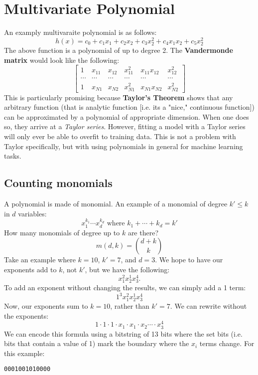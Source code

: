 \documentclass[titlepage, 12pt, leqno]{article}
\begin{document}
\section{Multivariate Polynomial}
An examply multivaraite polynomial is as follows:
\[
    h(x) = c_0 + c_1x_1 + c_2x_2 + c_3x_2^{2} + c_4x_1x_2 + c_5x_2^{2}
\]
The above function is a polynomial of up to degree 2. The \textbf{Vandermonde
matrix} would look like the following:
\[
\begin{bmatrix}
    1 & x_{11} & x_{12} & x^{2}_{11} & x_{11}x_{12} & x_{12}^{2}\\ 
    \cdots & \cdots  & \cdots  & \cdots  & \cdots & \cdots \\ 
    1 & x_{N1} & x_{N2} & x_{N1}^{2}  & x_{N1}x_{N2} & x_{N2}^{2} 
\end{bmatrix}
\]
This is particularly promising because \textbf{Taylor's Theorem} shows that any
arbitrary function (that is analytic function [i.e. its a "nice," continuous
function]) can be approximated by a polynomial of appropriate dimension. When one
does so, they arrive at a \textit{Taylor series}. However, fitting a model with a
Taylor series will only ever be able to overfit to training data. This is not a
problem with Taylor specifically, but with using polynomials in general 
for machine learning tasks.

\subsection{Counting monomials}
A polynomial is made of monomial. An example of a monomial of degree $k'\le k$ in
$d$ variables:
\[
    x_1^{k_1} \cdots x_d^{k_d} \text{ where } k_1 + \cdots + k_d = k'
\]
How many monomials of degree up to $k$ are there?
\[
    m(d,k) = \binom{d+k}{k}
\]
Take an example where $k = 10$, $k'=7$, and $d = 3$. We hope to have our exponents
add to $k$, not $k'$, but we have the following:
\[
    x_1^{2}  x_2^{1}  x_3^{4}.
\]
To add an exponent without changing the results, we can simply add a 1 term:
\[
    1^{3}  x_1^{2}  x_2^{1}  x_3^{4}
\]
Now, our exponents sum to $k=10$, rather than $k'=7$. We can rewrite without the
exponents:
\[
    1 \cdot 1 \cdot 1 \cdot x_1 \cdot x_1 \cdot x_2 \cdots \cdot x_3^{4}
\]
We can encode this formula using a bitstring of 13 bits where the set bits (i.e.
bits that contain a value of 1) mark the boundary where the $x_i$ terms change.
For this example:
\begin{verbatim}
0001001010000
\end{verbatim}
\end{document}
